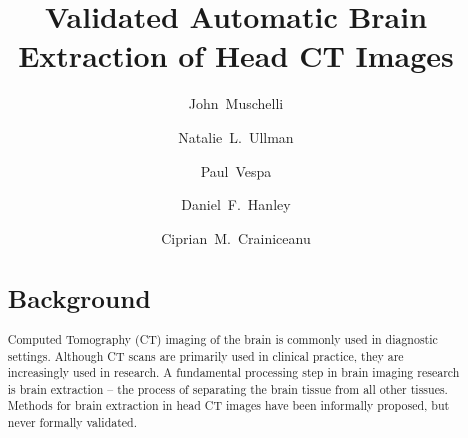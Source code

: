 \documentclass{elsarticle}\usepackage[]{graphicx}\usepackage[]{color}
\begin{document}
\renewcommand{\thesubfigure}{\Alph{subfigure}}

\begin{frontmatter}

\date{}

\title{Validated Automatic Brain Extraction of Head CT Images}

% 
% 
% 
% 
% 


\author[jhsph]{John~Muschelli}

\author[jhmi]{Natalie~L.~Ullman}

\author[ucla]{Paul~Vespa}


\author[jhmi]{Daniel~F.~Hanley}

\author[jhsph]{Ciprian~M.~Crainiceanu}


\address[jhsph]{Department of Biostatistics, Bloomberg School of Public Health, Johns Hopkins University, Baltimore, MD, USA}
\address[jhmi]{Department of Neurology, Division of Brain Injury Outcomes,  Johns Hopkins Medical Institutions, Baltimore, MD, USA}
\address[ucla]{Department of Neurosurgery, David Geffen School of Medicine at UCLA, Los Angeles, CA, USA}






\begin{abstract}
\section*{Background}
Computed Tomography (CT) imaging of the brain is commonly used in diagnostic settings.  Although CT scans are primarily used in clinical practice, they are increasingly used in research.  A fundamental processing step in brain imaging research is brain extraction -- the process of separating the brain tissue from all other tissues. Methods for brain extraction in head CT images have been informally proposed, but never formally validated.



\end{abstract}
\end{frontmatter}
\end{document}
